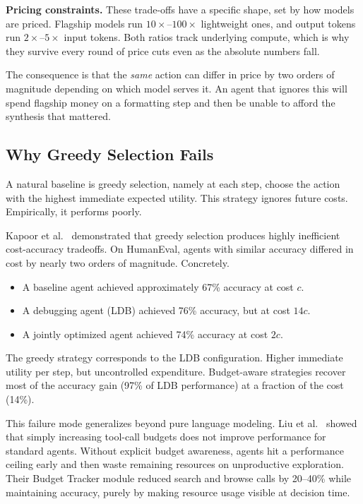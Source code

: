 \textbf{Pricing constraints.} These trade-offs have a specific shape, set by how models are priced. Flagship models run $10\times$--$100\times$ lightweight ones, and output tokens run $2\times$--$5\times$ input tokens. Both ratios track underlying compute, which is why they survive every round of price cuts even as the absolute numbers fall.

The consequence is that the \emph{same} action can differ in price by two orders of magnitude depending on which model serves it. An agent that ignores this will spend flagship money on a formatting step and then be unable to afford the synthesis that mattered.

\subsection{Why Greedy Selection Fails}

A natural baseline is greedy selection, namely at each step, choose the action with the highest immediate expected utility. This strategy ignores future costs. Empirically, it performs poorly.

Kapoor et al.\ \cite{kapoor2024agents} demonstrated that greedy selection produces highly inefficient cost-accuracy tradeoffs. On HumanEval, agents with similar accuracy differed in cost by nearly two orders of magnitude. Concretely.
\begin{itemize}
    \item A baseline agent achieved approximately 67\% accuracy at cost $c$.
    \item A debugging agent (LDB) achieved 76\% accuracy, but at cost $14c$.
    \item A jointly optimized agent achieved 74\% accuracy at cost $2c$.
\end{itemize}
The greedy strategy corresponds to the LDB configuration. Higher immediate utility per step, but uncontrolled expenditure. Budget-aware strategies recover most of the accuracy gain (97\% of LDB performance) at a fraction of the cost (14\%).

This failure mode generalizes beyond pure language modeling. Liu et al.\ \cite{liu2025bats} showed that simply increasing tool-call budgets does not improve performance for standard agents. Without explicit budget awareness, agents hit a performance ceiling early and then waste remaining resources on unproductive exploration. Their Budget Tracker module reduced search and browse calls by 20--40\% while maintaining accuracy, purely by making resource usage visible at decision time.

